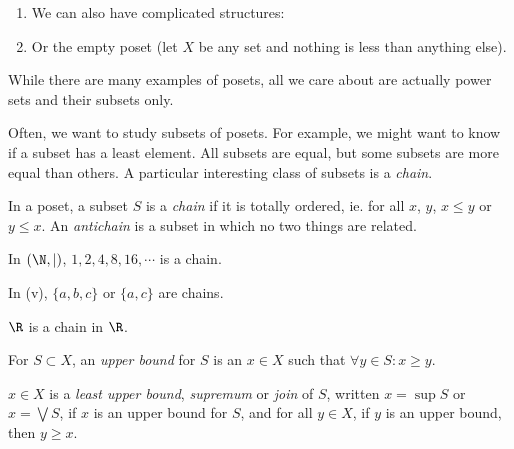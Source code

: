 \documentclass[a4paper]{article}
\begin{document}
\begin{eg}
\begin{enumerate}
\begin{center}
      \end{center}
    \item We can also have complicated structures:
      \begin{center}
      \end{center}
    \item Or the empty poset (let $X$ be any set and nothing is less than anything else).
  \end{enumerate}
\end{eg}
While there are many examples of posets, all we care about are actually power sets and their subsets only.

Often, we want to study subsets of posets. For example, we might want to know if a subset has a least element. All subsets are equal, but some subsets are more equal than others. A particular interesting class of subsets is a \emph{chain}.
\begin{defi}
  In a poset, a subset $S$ is a \emph{chain} if it is totally ordered, ie. for all $x$, $y$, $x\leq y$ or $y\leq x$. An \emph{antichain} is a subset in which no two things are related.
\end{defi}

\begin{eg}
  In $(\N, \mid )$, $1, 2, 4, 8, 16, \cdots$ is a chain.

  In (v), $\{a, b, c\}$ or $\{a, c\}$ are chains.

  $\R$ is a chain in $\R$.
\end{eg}

\begin{defi}
  For $S\subset X$, an \emph{upper bound} for $S$ is an $x\in X$ such that $\forall y\in S: x \geq y$.

  $x\in X$ is a \emph{least upper bound}, \emph{supremum} or \emph{join} of $S$, written $x = \sup S$ or $x = \bigvee S$, if $x$ is an upper bound for $S$, and for all $y \in X$, if $y$ is an upper bound, then $y \geq x$.
\end{defi}
\end{document}
